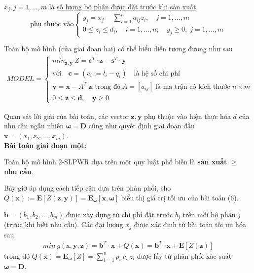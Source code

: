 \documentclass[a4paper]{article}
\begin{document}
    $x_j, j=1, \dots, m$ là \underline{số lượng bộ phận được đặt trước khi sản xuất}.
    \begin{displaymath}
        \text{phụ thuộc vào}
        \begin{cases}
            y_j = x_j - \sum_{i=1}^{n}a_{ij}z_i, \quad j=1, \dots, m \\
            0 \leq z_i \leq d_i, \quad i=1, \dots, n; \quad y_j \geq 0, \; j=1, \dots, m
        \end{cases}
    \end{displaymath}

    Toàn bộ mô hình (của giai đoạn hai) có thể biểu diễn tương đương như sau
    \begin{gather}
        MODEL=
        \begin{cases}
            min_{\boldsymbol{z,y}} \: Z = \boldsymbol{c}^T \cdot \boldsymbol{z} - \boldsymbol{s}^T \cdot \boldsymbol{y}\\
            \text{với} \quad \boldsymbol{c} = (c_i \mathrel{:=} l_i - q_i) \quad \text{là hệ số chi phí}\\
            \boldsymbol{y}=\boldsymbol{x}-A^T \: \boldsymbol{z}, \text{trong đó} \; A=[a_{ij}] \; \text{là ma trận có kích thước $n \times m$}\\
            0 \leq \boldsymbol{z} \leq \boldsymbol{d}, \quad \boldsymbol{y} \geq 0
        \end{cases}
    \end{gather}
    
    Quan sát lời giải của bài toán, các vector $\boldsymbol{z, y}$ phụ thuộc vào hiện thực hóa $d$ của nhu cầu ngẫu nhiên
    $\boldsymbol{\omega = D}$ cũng như quyết định giai đoạn đầu $\boldsymbol{x}=(x_1,x_2, \dots , x_m)$.\\

    \textbf{Bài toán giai đoạn một:}

    Toàn bộ mô hình 2-SLPWR dựa trên một quy luật phổ biến là \textbf{sản xuất} $\geq$ \textbf{nhu cầu}.

    Bây giờ áp dụng cách tiếp cận dựa trên phân phối, cho $Q(\boldsymbol{x}) \mathrel{:=} \mathbf{E}[Z(\boldsymbol{z, y})]= \mathbf{E_{\boldsymbol{\omega}}}[\boldsymbol{x, \omega}]$
    biểu thị giá trị tối ưu của bài toán (6).
    
    \underline{$\boldsymbol{b}=(b_1,b_2, \dots, b_m)$ được xây dựng từ chi phí đặt trước $b_j$ trên mỗi bộ phận $j$} (trước khi biết nhu cầu).
    Các đại lượng $x_j$ được xác định từ bài toán tối ưu hóa sau
    \begin{gather}
        min \: g(\boldsymbol{\mathrm{x}, y, z}) = \boldsymbol{b}^T \cdot \boldsymbol{x} + Q(\boldsymbol{x}) =
        \boldsymbol{b}^T \cdot \boldsymbol{x} + \mathbf{E}[Z(\boldsymbol{z})]
    \end{gather}
    trong đó $Q(\boldsymbol{x})=\mathbf{E_\omega}[Z]=\sum_{i=1}^{n}p_i \: c_i \: z_i$ được lấy từ phân phối xác suất $\boldsymbol{\omega = D}$.
\end{document}
